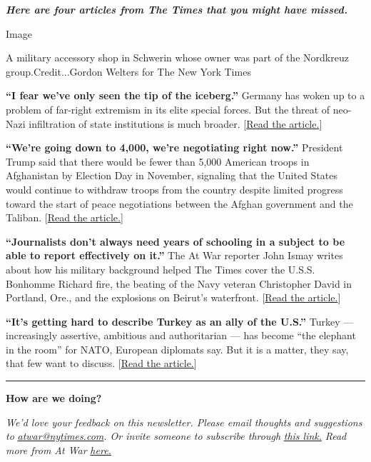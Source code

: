 \emph{\textbf{Here are four articles from The Times that you might have
missed.}}

Image

A military accessory shop in Schwerin whose owner was part of the
Nordkreuz group.Credit...Gordon Welters for The New York Times

\textbf{``I fear we've only seen the tip of the iceberg.''} Germany has
woken up to a problem of far-right extremism in its elite special
forces. But the threat of neo-Nazi infiltration of state institutions is
much broader.
{[}\href{https://www.nytimes.com/2020/08/01/world/europe/germany-nazi-infiltration.html}{Read
the article.}{]}

\textbf{``We're going down to 4,000, we're negotiating right now.''}
President Trump said that there would be fewer than 5,000 American
troops in Afghanistan by Election Day in November, signaling that the
United States would continue to withdraw troops from the country despite
limited progress toward the start of peace negotiations between the
Afghan government and the Taliban.
{[}\href{https://www.nytimes.com/2020/08/04/world/asia/us-troops-afghanistan.html}{Read
the article.}{]}

\textbf{``Journalists don't always need years of schooling in a subject
to be able to report effectively on it.''} The At War reporter John
Ismay writes about how his military background helped The Times cover
the U.S.S. Bonhomme Richard fire, the beating of the Navy veteran
Christopher David in Portland, Ore., and the explosions on Beirut's
waterfront.
{[}\href{https://www.nytimes.com/2020/08/06/insider/bomb-training-beirut-explosions.html}{Read
the article.}{]}

\textbf{``It's getting hard to describe Turkey as an ally of the U.S.''}
Turkey --- increasingly assertive, ambitious and authoritarian --- has
become ``the elephant in the room'' for NATO, European diplomats say.
But it is a matter, they say, that few want to discuss.
{[}\href{https://www.nytimes.com/2020/08/03/world/europe/turkey-nato.html}{Read
the article.}{]}

\begin{center}\rule{0.5\linewidth}{\linethickness}\end{center}

\textbf{How are we doing?}

\emph{We'd love your feedback on this newsletter. Please email thoughts
and suggestions to}
\href{mailto:atwar@nytimes.com?subject=Newsletter\%20Feedback}{\emph{atwar@nytimes.com}}\emph{.
Or invite someone to subscribe through}
\href{https://www.nytimes.com/newsletters/at-war}{\emph{this link.}}
\emph{Read more from At War}
\href{https://www.nytimes.com/atwar}{\emph{here.}}

